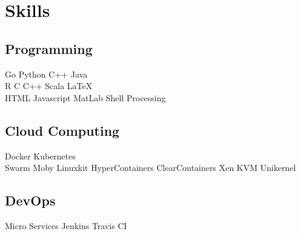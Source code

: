 \documentclass[]{deedy-resume-openfont}
\begin{document}
\begin{minipage}[t]{0.25\textwidth}

\section{Skills}
\sectionsep
\subsection{Programming}
Go \textbullet{} Python \textbullet{} C++ \textbullet{} Java \\
R \textbullet{} C \textbullet{} C++ \textbullet{} Scala \textbullet{} \LaTeX\ \\
HTML \textbullet{} Javascript \textbullet{} MatLab \textbullet{} Shell \textbullet{} Processing \\ 
\sectionsep

\subsection{Cloud Computing}
Docker \textbullet{} Kubernetes \\
Swarm \textbullet{} Moby \textbullet{} Linuxkit \textbullet{} HyperContainers \textbullet{} ClearContainers \textbullet{} Xen \textbullet{} KVM \textbullet{} Unikernel \\
\sectionsep

\subsection{DevOps}
Micro Services \textbullet{} Jenkins \textbullet{} Travis CI

%
%

\end{minipage} 
\hfill
\end{document}
